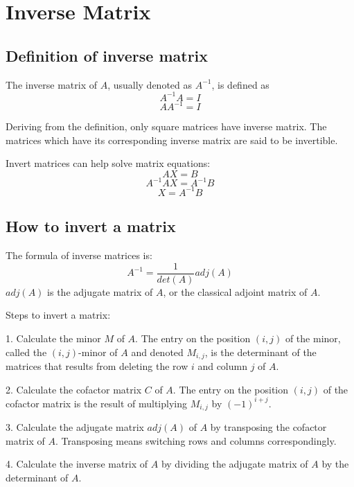 \documentclass{article}
\begin{document}
\section{Inverse Matrix}

\subsection{Definition of inverse matrix}

The inverse matrix of $A$, usually denoted as $A^{-1}$, is defined as
\[
  A^{-1}A = I
\]
\[
  AA^{-1} = I
\]

Deriving from the definition, only square matrices have inverse matrix. The 
matrices which have its corresponding inverse matrix are said to be invertible.

Invert matrices can help solve matrix equations:
\[
  AX = B
\]
\[
  A^{-1}AX = A^{-1}B
\]
\[
  X = A^{-1}B
\]

\subsection{How to invert a matrix}

The formula of inverse matrices is:
\[
  A^{-1} = \frac{1}{det(A)}adj(A)
\]
$adj(A)$ is the adjugate matrix of $A$, or the classical adjoint matrix of $A$.

\bigskip

Steps to invert a matrix:

1. Calculate the minor $M$ of $A$. The entry on the position $(i,j)$ of the 
minor, called the $(i,j)$-minor of $A$ and denoted $M_{i,j}$, is the determinant 
of the matrices that results from deleting the row $i$ and column $j$ of $A$.

2. Calculate the cofactor matrix $C$ of $A$. The entry on the position $(i,j)$ 
of the cofactor matrix is the result of multiplying $M_{i,j}$ by $(-1)^{i+j}$.

3. Calculate the adjugate matrix $adj(A)$ of $A$ by transposing the cofactor 
matrix of $A$. Transposing means switching rows and columns correspondingly.

4. Calculate the inverse matrix of $A$ by dividing the adjugate matrix of $A$ by the determinant of $A$.
\end{document}
